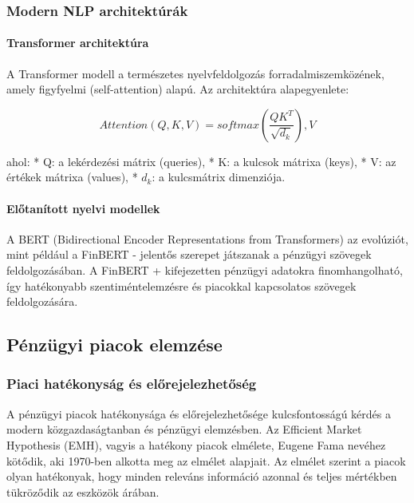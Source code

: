 \documentclass[11pt]{article}
\begin{document}
\subsubsection{Modern NLP
architektúrák}\label{modern-nlp-architektuxfaruxe1k}

\paragraph{Transformer architektúra}\label{transformer-architektuxfara}

A Transformer modell a természetes nyelvfeldolgozás
forradalmiszemközének, amely figyfyelmi (self-attention) alapú. Az
architektúra alapegyenlete:

\[Attention(Q,K,V) = softmax(\frac{QK^T}{\sqrt{d_k}}),V\]

ahol: * Q: a lekérdezési mátrix (queries), * K: a kulcsok mátrixa
(keys), * V: az értékek mátrixa (values), * \(d_k\): a kulcsmátrix
dimenziója.

\paragraph{Előtanított nyelvi
modellek}\label{elux151tanuxedtott-nyelvi-modellek}

A BERT (Bidirectional Encoder Representations from Transformers) az
evolúziót, mint például a FinBERT - jelentős szerepet játszanak a
pénzügyi szövegek feldolgozásában. A FinBERT + kifejezetten pénzügyi
adatokra finomhangolható, így hatékonyabb szentiméntelemzésre és
piacokkal kapcsolatos szövegek feldolgozására.

    \subsection{Pénzügyi piacok
elemzése}\label{puxe9nzuxfcgyi-piacok-elemzuxe9se}

\subsubsection{Piaci hatékonyság és
előrejelezhetőség}\label{piaci-hatuxe9konysuxe1g-uxe9s-elux151rejelezhetux151suxe9g}

A pénzügyi piacok hatékonysága és előrejelezhetősége kulcsfontosságú
kérdés a modern közgazdaságtanban és pénzügyi elemzésben. Az Efficient
Market Hypothesis (EMH), vagyis a hatékony piacok elmélete, Eugene Fama
nevéhez kötődik, aki 1970-ben alkotta meg az elmélet alapjait. Az
elmélet szerint a piacok olyan hatékonyak, hogy minden releváns
információ azonnal és teljes mértékben tükröződik az eszközök árában.
\end{document}
